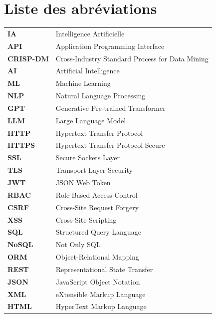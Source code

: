 
\chapter*{Liste des abréviations}

\vspace{1cm}

\begin{longtable}{ll}
\textbf{IA} & Intelligence Artificielle \\
\textbf{API} & Application Programming Interface \\
\textbf{CRISP-DM} & Cross-Industry Standard Process for Data Mining \\
\textbf{AI} & Artificial Intelligence \\
\textbf{ML} & Machine Learning \\
\textbf{NLP} & Natural Language Processing \\
\textbf{GPT} & Generative Pre-trained Transformer \\
\textbf{LLM} & Large Language Model \\
\textbf{HTTP} & Hypertext Transfer Protocol \\
\textbf{HTTPS} & Hypertext Transfer Protocol Secure \\
\textbf{SSL} & Secure Sockets Layer \\
\textbf{TLS} & Transport Layer Security \\
\textbf{JWT} & JSON Web Token \\
\textbf{RBAC} & Role-Based Access Control \\
\textbf{CSRF} & Cross-Site Request Forgery \\
\textbf{XSS} & Cross-Site Scripting \\
\textbf{SQL} & Structured Query Language \\
\textbf{NoSQL} & Not Only SQL \\
\textbf{ORM} & Object-Relational Mapping \\
\textbf{REST} & Representational State Transfer \\
\textbf{JSON} & JavaScript Object Notation \\
\textbf{XML} & eXtensible Markup Language \\
\textbf{HTML} & HyperText Markup Language \\

\end{longtable}
